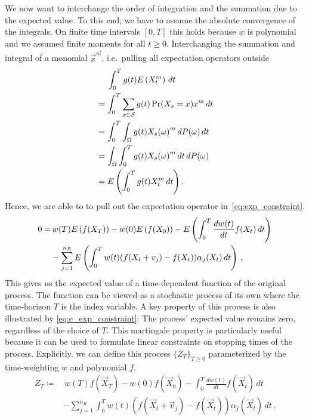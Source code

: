 We now want to interchange the order of integration and the summation
due to the expected value.
To this end, we have to assume the absolute convergence of the integrals.
On finite time intervals $[0,T]$ this holds because $w$
is polynomial and we assumed finite moments for all $t\geq 0$.
Interchanging the  summation  and integral of a monomial
${\vec{x}}^{\vec{m}}$, i.e.\ pulling all expectation operators outside
\begin{align*}
  & \;\quad\int_{0}^Tg(t){E}\left(X_t^{m}\right)\,dt\\
  & =\int_{0}^T\sum_{x\in\mathcal{S}}g(t)\Pr(X_s=x)x^m\,dt\\
  & =\int_{0}^T\int_{\Omega} g(t) {X_s(\omega)}^m\,dP(\omega)\,dt\\
  & =\int_{\Omega}\int_{0}^T g(t) {X_s(\omega)}^m\,dt\,dP(\omega)\\
  & ={E}\left(\int_{0}^Tg(t){X}_t^{m}\,dt\right).
\end{align*}
Hence, we are able to to pull out the expectation operator
in~\eqref{eq:exp_constraint}.
\begin{equation}\label{eq:e_exp_constraint}
  \begin{split}
    0=&\,w(T){E}\left(f(X_T)\right) - w(0){E}\left(f(X_{0})\right) -
    {E}\left(\int_{0}^T\frac{dw(t)}{dt}f(X_t)\,dt\right)\\
    &-\sum_{j=1}^{n_R}{E}\left(\int_{0}^Tw(t)
    (f(X_t+v_j) - f(X_t))\alpha_j(X_t)\,dt\right)\,,
  \end{split}
\end{equation}
This gives us the expected value of a time-dependent function of the
original process.
The function can be viewed as a stochastic process of its own where the
time-horizon $T$ is the index variable. A key property
of this process is also illustrated by \eqref{eq:e_exp_constraint}: The process'
expected value remains zero, regardless of the choice of $T$.
This martingale property is particularly useful because it can be used
to formulate linear constraints on stopping times of the process.
Explicitly, we can define this process $\{Z_T\}_{T\geq 0}$ parameterized by
the time-weighting $w$ and polynomial $f$.
\begin{equation}\label{eq:martingale}
  \begin{split}
    Z_T\coloneqq&\,w(T)f(\vec X_T) - w(0)f(\vec X_{0}) -
    \int_{0}^T\frac{dw(t)}{dt}f(\vec X_t)\,dt\\
    &-\sum_{j=1}^{n_R}\int_{0}^Tw(t)
    (f(\vec X_t+\vec v_j) - f(\vec X_t))\alpha_j(\vec X_t)\,dt\,.
  \end{split}
\end{equation}
